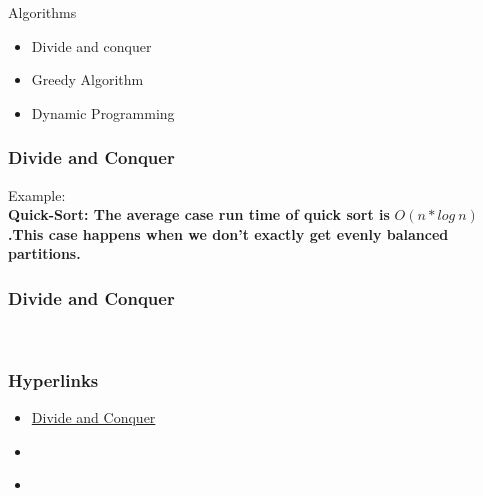 \documentclass{beamer}
\begin{document}
\begin{frame}{Algorithms}%
\transblindshorizontal%
\label{algos}%
\transdissolve  %

\begin{itemize}
    \item Divide and conquer \pause %
    \invisible \item Greedy Algorithm \pause%
    \invisible \item Dynamic Programming 
\end{itemize}
    
\end{frame}
\begin{frame}%
\transblindshorizontal%
\frametitle{Divide and Conquer}%
\label{dc}%
Example:\\
\textbf{Quick-Sort:  The average case run time of quick sort is }%
$O(n \ast log\ n)$\textbf{.This case happens when we don't exactly
get evenly balanced partitions.}%
\end{frame}


\begin{frame}%
\transblindshorizontal%
\frametitle{Divide and Conquer}%
\color{red}{Example:}\\
\color{black}{Merge-Sort: }\color{orange}{The time complexity of Merge Sort is $ O(n \ast log\ n)$. Merge Sort is useful for sorting linked lists in $O(n \ast log\ n)$ time.}%
\end{frame}


\begin{frame}%
\transblindshorizontal%
\frametitle{Hyperlinks}%
\begin{itemize}%
\item \hyperlink{algos}{Divide and Conquer}%
\item  \hyperlink{algos}{}%
\item  \hyperlink{algos}{}%
\end{itemize}
\end{frame}
\end{document}
